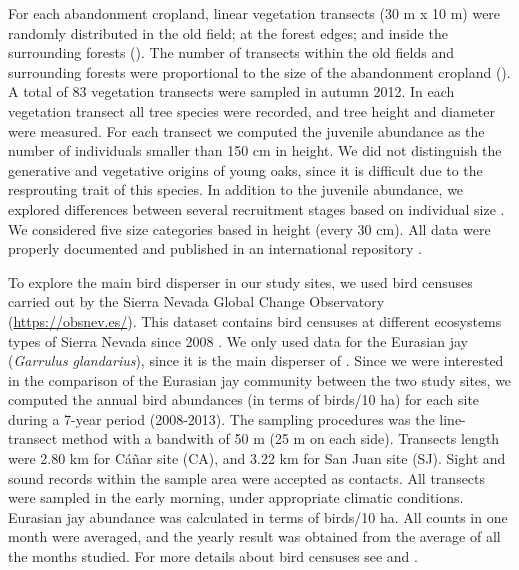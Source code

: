 For each abandonment cropland, linear vegetation transects (30 m x 10 m) were randomly distributed in the old field; at the forest edges; and inside the surrounding forests (). The number of transects within the old fields and surrounding forests were proportional to the size of the abandonment cropland (). A total of 83 vegetation transects were sampled in autumn 2012. In each vegetation transect all tree species were recorded, and tree height and diameter were measured. For each transect we computed the juvenile abundance as the number of individuals smaller than 150 cm in height. We did not distinguish the generative and vegetative origins of young oaks, since it is difficult due to the resprouting trait of this species. In addition to the juvenile abundance, we explored differences between several recruitment stages based on individual size \autocites[\emph{e.g}][]{Plieningeretal2010LargeScalePatterns}. We considered five size categories based in height (every 30 cm). All data were properly documented and published in an international repository \autocites[see][for a detailed description of the dataset]{PerezLuqueetal2015DatasetMIGRAME}. 

To explore the main bird disperser in our study sites, we used bird censuses carried out by the Sierra Nevada Global Change Observatory (\href{https://obsnev.es/}{https://obsnev.es/}). This dataset contains bird censuses at different ecosystems types of Sierra Nevada since 2008 \autocites[for more details see][]{BareaAzconetal2012PasseriformesOtras, PerezLuqueetal2016DatasetPasserine}. We only used data for the Eurasian jay (\emph{Garrulus glandarius}), since it is the main disperser of \Qpy \autocites{Gomez2003ImpactVertebrate}. Since we were interested in the comparison of the Eurasian jay community between the two study sites, we computed the annual bird abundances (in terms of birds/10 ha) for each site during a 7-year period (2008-2013). The sampling procedures was the line-transect method with a bandwith of 50 m (25 m on each side). Transects length were 2.80 km for Cáñar site (CA), and 3.22 km for San Juan site (SJ). Sight and sound records within the sample area were accepted as contacts. All transects were sampled in the early morning, under appropriate climatic conditions. Eurasian jay abundance was calculated in terms of birds/10 ha. All counts in one month were averaged, and the yearly result was obtained from the average of all the months studied. For more details about bird censuses see \citet{BareaAzconetal2012PasseriformesOtras} and \citet{ZamoraBareaAzcon2015LongTermChanges}.

